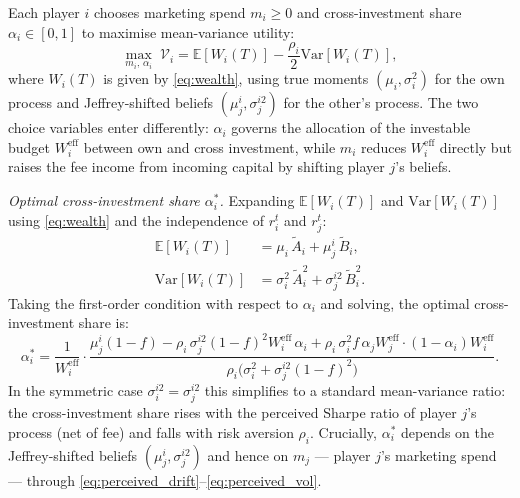 \documentclass[12pt,a4paper]{article}
\newcommand{\E}{\mathbb{E}}
\newcommand{\Var}{\mathrm{Var}}
\newcommand{\1}{\mathbf{1}}
\begin{document}
Each player $i$ chooses marketing spend $m_i \geq 0$ and
cross-investment share $\alpha_i \in [0,1]$ to maximise
mean-variance utility:
\begin{equation}
  \max_{m_i,\,\alpha_i}\;
  \mathcal{V}_i
  = \E[W_i(T)] - \frac{\rho_i}{2}\Var[W_i(T)],
  \label{eq:utility_max}
\end{equation}
where $W_i(T)$ is given by \eqref{eq:wealth}, using true moments
$(\mu_i, \sigma_i^2)$ for the own process and Jeffrey-shifted
beliefs $(\mu_j^i, \sigma_j^{i2})$ for the other's process.
The two choice variables enter differently: $\alpha_i$ governs
the allocation of the investable budget $W_i^{\mathrm{eff}}$
between own and cross investment, while $m_i$ reduces
$W_i^{\mathrm{eff}}$ directly but raises the fee income from
incoming capital by shifting player $j$'s beliefs.

\textit{Optimal cross-investment share $\alpha_i^*$.}
Expanding $\E[W_i(T)]$ and $\Var[W_i(T)]$ using \eqref{eq:wealth}
and the independence of $r_i^t$ and $r_j^t$:
\begin{align}
  \E[W_i(T)]
    &= \mu_i\,\tilde{A}_i + \mu_j^i\,\tilde{B}_i,
  \label{eq:EW}\\
  \Var[W_i(T)]
    &= \sigma_i^2\,\tilde{A}_i^2
     + \sigma_j^{i2}\,\tilde{B}_i^2.
  \label{eq:VarW}
\end{align}
Taking the first-order condition with respect to $\alpha_i$
and solving, the optimal cross-investment share is:
\begin{equation}
  \alpha_i^*
  = \frac{1}{W_i^{\mathrm{eff}}}
    \cdot
    \frac{\mu_j^i(1-f) - \rho_i\,\sigma_j^{i2}(1-f)^2
          W_i^{\mathrm{eff}}\,\alpha_i
          + \rho_i\,\sigma_i^2 f\,\alpha_j W_j^{\mathrm{eff}}
          \cdot (1-\alpha_i)W_i^{\mathrm{eff}}}
         {\rho_i\bigl(\sigma_i^2 + \sigma_j^{i2}(1-f)^2\bigr)}.
  \label{eq:alpha_star_implicit}
\end{equation}
In the symmetric case $\sigma_i^{i2} = \sigma_j^{i2}$ this
simplifies to a standard mean-variance ratio: the cross-investment
share rises with the perceived Sharpe ratio of player $j$'s process
(net of fee) and falls with risk aversion $\rho_i$. Crucially,
$\alpha_i^*$ depends on the Jeffrey-shifted beliefs $(\mu_j^i,
\sigma_j^{i2})$ and hence on $m_j$ --- player $j$'s marketing
spend --- through \eqref{eq:perceived_drift}--\eqref{eq:perceived_vol}.
\end{document}
